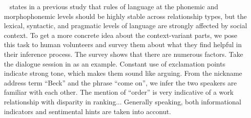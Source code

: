 \citeauthor{flover}~ states in a previous study that rules of 
language at the phonemic and morphophonemic levels should be highly stable across 
relationship types, but the lexical, syntactic, and pragmatic levels of language are 
strongly affected by social context. To get a more concrete idea about the 
context-variant parts, we pose this task to human volunteers and 
survey them about 
what they find helpful in their inference process. 
The survey shows that there are numerous factors. 
Take the dialogue session in  as an example.
Constant use of exclamation points indicate strong tone, 
which makes them sound like arguing.
From the nickname address term ``Beck'' and the phrase ``come on'', 
we infer the two speakers are familiar with each other. 
The mention of ``order'' is very indicative of a work relationship with 
disparity in ranking... 
Generally speaking, both informational indicators and sentimental 
hints are taken into acconut.

